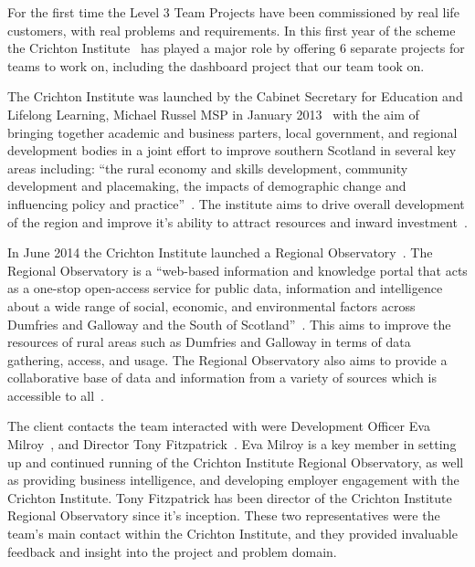 \documentclass{l3proj}
\begin{document}
For the first time the Level 3 Team Projects have been commissioned by real life customers, with real problems and requirements. In this first year of the scheme the Crichton Institute~\cite{CrichtonInstitute} has played a major role by offering 6 separate projects for teams to work on, including the dashboard project that our team took on.


The Crichton Institute was launched by the Cabinet Secretary for Education and Lifelong Learning, Michael Russel MSP in January 2013~\cite{CrichtonInsituteFounded} with the aim of bringing together academic and business parters, local government, and regional development bodies in a joint effort to improve southern Scotland in several key areas including: ``the rural economy and skills development, community development and placemaking, the impacts of demographic change and influencing policy and practice''~\cite{CrichtonInsituteCoreAims}. The institute aims to drive overall development of the region and improve it's ability to attract resources and inward investment~\cite{CrichtonInstituteAboutUs}.

In June 2014 the Crichton Institute launched a Regional Observatory~\cite{CrichtonInstituteRegionalObservatory}. The Regional Observatory is a ``web-based information and knowledge portal that acts as a one-stop open-access service for public data, information and intelligence about a wide range of social, economic, and environmental factors across Dumfries and Galloway and the South of Scotland''~\cite{ScotGovOpenDataResourcePack}. This aims to improve the resources of rural areas such as Dumfries and Galloway in terms of data gathering, access, and usage. The Regional Observatory also aims to provide a collaborative base of data and information from a variety of sources which is accessible to all~\cite{ScotGovOpenDataResourcePack}.

The client contacts the team interacted with were Development Officer Eva Milroy~\cite{EvaMilroyLinkedIn}, and Director Tony Fitzpatrick~\cite{TonyFitzpatrickLinkedIn}. Eva Milroy is a key member in setting up and continued running of the Crichton Institute Regional Observatory, as well as providing business intelligence, and developing employer engagement with the Crichton Institute. Tony Fitzpatrick has been director of the Crichton Institute Regional Observatory since it's inception. These two representatives were the team's main contact within the Crichton Institute, and they provided invaluable feedback and insight into the project and problem domain.
\end{document}
